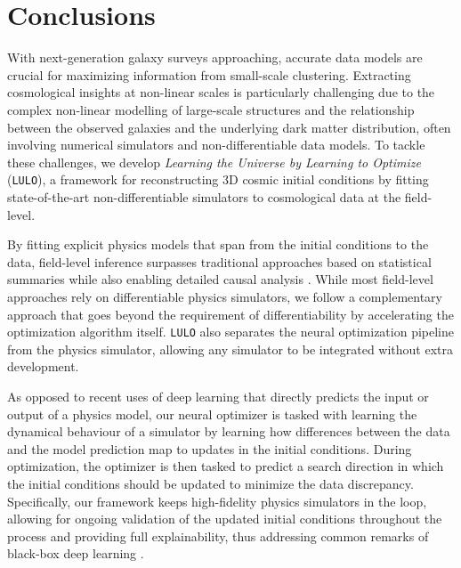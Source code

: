 \section{Conclusions}
\label{sec:conc}

With next-generation galaxy surveys approaching, accurate data models are crucial for maximizing information from small-scale clustering. Extracting cosmological insights at non-linear scales is particularly challenging due to the complex non-linear modelling of large-scale structures and the relationship between the observed galaxies and the underlying dark matter distribution, often involving numerical simulators and non-differentiable data models. To tackle these challenges, we develop \textit{Learning the Universe by Learning to Optimize} (\texttt{LULO}), a framework for reconstructing 3D cosmic initial conditions by fitting state-of-the-art non-differentiable simulators to cosmological data at the field-level. 

By fitting explicit physics models that span from the initial conditions to the data, field-level inference surpasses traditional approaches based on statistical summaries while also enabling detailed causal analysis \citep[see e.g.][]{Jasche2019,Mcalpine2022,Wempe2024}. While most field-level approaches rely on differentiable physics simulators, we follow a complementary approach that goes beyond the requirement of differentiability by accelerating the optimization algorithm itself. \texttt{LULO} also separates the neural optimization pipeline from the physics simulator, allowing any simulator to be integrated without extra development.

As opposed to recent uses of deep learning that directly predicts the input or output of a physics model, our neural optimizer is tasked with learning the dynamical behaviour of a simulator by learning how differences between the data and the model prediction map to updates in the initial conditions. During optimization, the optimizer is then tasked to predict a search direction in which the initial conditions should be updated to minimize the data discrepancy. Specifically, our framework keeps high-fidelity physics simulators in the loop, allowing for ongoing validation of the updated initial conditions throughout the process and providing full explainability, thus addressing common remarks of black-box deep learning \citep[e.g.][]{Angulo2021, Huertas-Company2022}. 


